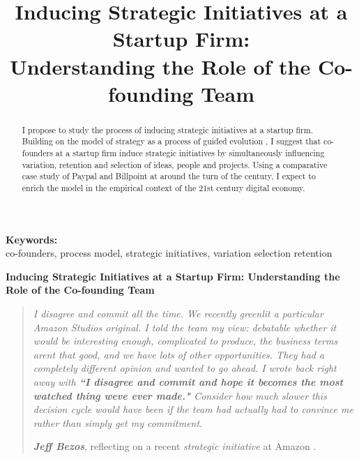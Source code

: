 \documentclass[12pt,letterpaper]{article}
\begin{document}
\title{Inducing Strategic Initiatives at a Startup Firm:\\Understanding the Role of the Co-founding Team}
\date{}
\maketitle

\begin{abstract} 
\normalsize I propose to study the process of inducing strategic initiatives at a startup firm. Building on the model of strategy as a process of guided evolution \citep{Lovas2000}, I suggest that co-founders at a startup firm induce strategic initiatives by simultaneously influencing variation, retention and selection of ideas, people and projects. Using a comparative case study of Paypal and Billpoint at around the turn of the century, I expect to enrich the \cite{Lovas2000} model in the empirical context of the 21st century digital economy.
\end{abstract}


{\textbf{Keywords:} \\\indent co-founders, process model, strategic initiatives, variation selection retention}

\newpage
\pagestyle{fancy}
\fancyhf{}
\rhead{\thepage}

\begin{center}
\textbf{Inducing Strategic Initiatives at a Startup Firm: Understanding the Role of the Co-founding Team}\vspace{1cm}
\end{center}

\begin{quotation}
\textit{I disagree and commit all the time. We recently greenlit a particular Amazon Studios original. I told the team my view: debatable whether it would be interesting enough, complicated to produce, the business terms aren\textquotesingle t that good, and we have lots of other opportunities. They had a completely different opinion and wanted to go ahead. I wrote back right away with \textbf{``I disagree and commit and hope it becomes the most watched thing we\textquotesingle ve ever made."} Consider how much slower this decision cycle would have been if the team had actually had to convince me rather than simply get my commitment.}\par
\null\hfill \textbf{\textit{Jeff Bezos}}, reflecting on a recent \textit{strategic initiative} at Amazon \citep{Bezos2016}.
\end{quotation}
\end{document}
